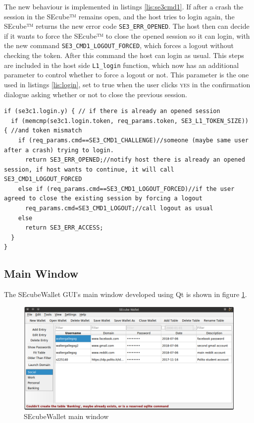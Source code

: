 The new behaviour is implemented in listings \ref{lis:se3cmd1}.
If after a crash the session in the SEcube™ remains open, and the host tries to login again, the SEcube™ returns the new error code \texttt{SE3\_ERR\_OPENED}. The host then can decide if it wants to force the SEcube™ to close the opened session so it can login, with the new command \texttt{SE3\_CMD1\_LOGOUT\_FORCED}, which forces a logout without checking the token. After this command the host can login as usual. This steps are included in the host side \texttt{L1\_login} function, which now has an additional parameter to control whether to force a logout or not. This parameter is the one used in listings \ref{lis:login}, set to true when the user clicks \textsc{yes} in the confirmation dialogue asking whether or not to close the previous session.

\begin{lstlisting}[style=customc, float=htb, caption={Modification in SEcubeFirmware, file se3\_cmd1.c}, label = {lis:se3cmd1}]
if (se3c1.login.y) { // if there is already an opened session
  if (memcmp(se3c1.login.token, req_params.token, SE3_L1_TOKEN_SIZE)) { //and token mismatch
    if (req_params.cmd==SE3_CMD1_CHALLENGE)//someone (maybe same user after a crash) trying to login.
      return SE3_ERR_OPENED;//notify host there is already an opened session, if host wants to continue, it will call SE3_CMD1_LOGOUT_FORCED
    else if (req_params.cmd==SE3_CMD1_LOGOUT_FORCED)//if the user agreed to close the existing session by forcing a logout
      req_params.cmd=SE3_CMD1_LOGOUT;//call logout as usual  
    else
      return SE3_ERR_ACCESS;
  }
}
\end{lstlisting}




\subsection{Main Window}

The SEcubeWallet GUI's main window developed using Qt is shown in figure \ref{fig:mainWindow}.

\begin{figure}[htb]
  \centering
  \captionsetup{justification=centering}
  \centerline{\includegraphics[width=1\columnwidth]{chapters/figures/development/mainWindow.png}}
  \caption{SEcubeWallet main window}
  \label{fig:mainWindow}
\end{figure}


